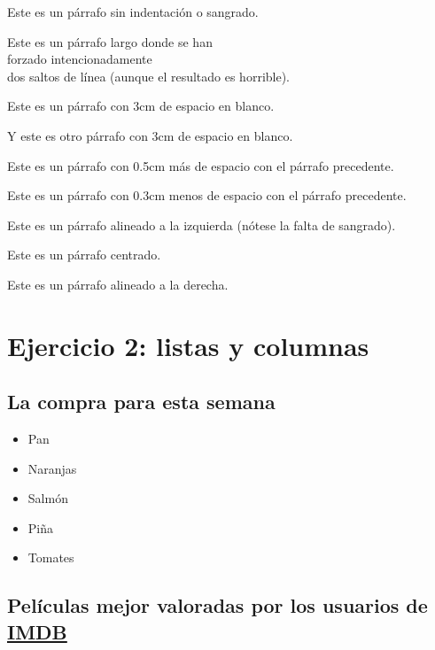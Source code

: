 \documentclass[a4paper,10pt]{article}
\theoremstyle{teorema}
\theoremstyle{plano}
\theoremstyle{titulo}
\begin{document}
\noindent Este es un párrafo sin indentación o sangrado.

Este es un párrafo largo donde se han\\ forzado intencionadamente\\ dos saltos de línea (aunque el resultado es horrible).

Este es un párrafo \hspace{3cm} con 3cm de espacio en blanco.

\hspace{3cm} Y este es otro párrafo con 3cm de espacio en blanco.

\vspace{+0.5cm}

Este es un párrafo con 0.5cm más de espacio con el párrafo precedente.

\vspace{-0.3cm}

Este es un párrafo con 0.3cm menos de espacio con el párrafo precedente.

\begin{flushleft}
Este es un párrafo alineado a la izquierda (nótese la falta de sangrado).
\end{flushleft}

\begin{center}
Este es un párrafo centrado.
\end{center}

\begin{flushright}
Este es un párrafo alineado a la derecha.
\end{flushright}

\section{Ejercicio 2: listas y columnas}

\subsection{La compra para esta semana}

\begin{itemize}
    \item Pan
\item Naranjas
\item Salmón
\item Piña
\item Tomates
\end{itemize}

\subsection{Películas mejor valoradas por los usuarios de \href{https://www.imdb.com/chart/top?ref_=nv_mv_250}{IMDB}}
\end{document}
